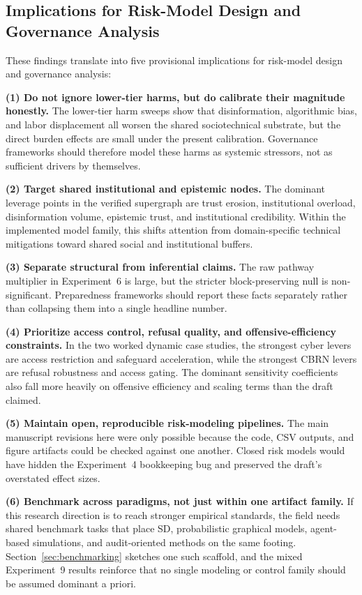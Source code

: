 \documentclass[11pt]{article}
\begin{document}
\subsection{Implications for Risk-Model Design and Governance Analysis}

These findings translate into five provisional implications for risk-model design and governance analysis:

\textbf{(1) Do not ignore lower-tier harms, but do calibrate their magnitude honestly.} The lower-tier harm sweeps show that disinformation, algorithmic bias, and labor displacement all worsen the shared sociotechnical substrate, but the direct burden effects are small under the present calibration. Governance frameworks should therefore model these harms as systemic stressors, not as sufficient drivers by themselves.

\textbf{(2) Target shared institutional and epistemic nodes.} The dominant leverage points in the verified supergraph are trust erosion, institutional overload, disinformation volume, epistemic trust, and institutional credibility. Within the implemented model family, this shifts attention from domain-specific technical mitigations toward shared social and institutional buffers.

\textbf{(3) Separate structural from inferential claims.} The raw pathway multiplier in Experiment~6 is large, but the stricter block-preserving null is non-significant. Preparedness frameworks should report these facts separately rather than collapsing them into a single headline number.

\textbf{(4) Prioritize access control, refusal quality, and offensive-efficiency constraints.} In the two worked dynamic case studies, the strongest cyber levers are access restriction and safeguard acceleration, while the strongest CBRN levers are refusal robustness and access gating. The dominant sensitivity coefficients also fall more heavily on offensive efficiency and scaling terms than the draft claimed.

\textbf{(5) Maintain open, reproducible risk-modeling pipelines.} The main manuscript revisions here were only possible because the code, CSV outputs, and figure artifacts could be checked against one another. Closed risk models would have hidden the Experiment~4 bookkeeping bug and preserved the draft's overstated effect sizes.

\textbf{(6) Benchmark across paradigms, not just within one artifact family.} If this research direction is to reach stronger empirical standards, the field needs shared benchmark tasks that place SD, probabilistic graphical models, agent-based simulations, and audit-oriented methods on the same footing. Section~\ref{sec:benchmarking} sketches one such scaffold, and the mixed Experiment~9 results reinforce that no single modeling or control family should be assumed dominant a priori.
\end{document}
